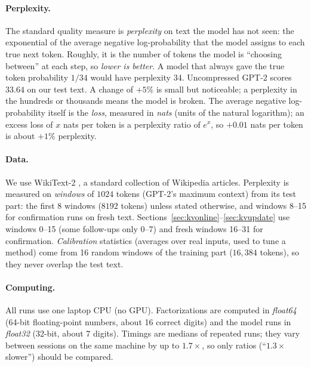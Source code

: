 \documentclass[10pt]{article}
\theoremstyle{plain}
\theoremstyle{definition}
\theoremstyle{remark}
\begin{document}
\paragraph{Perplexity.}
The standard quality measure is \emph{perplexity} on text the model has not seen: the exponential of the average negative log-probability that the model assigns to each true next token. Roughly, it is the number of tokens the model is ``choosing between'' at each step, so \emph{lower is better}. A model that always gave the true token probability $1/34$ would have perplexity 34. Uncompressed GPT-2 scores $33.64$ on our test text. A change of $+5\%$ is small but noticeable; a perplexity in the hundreds or thousands means the model is broken. The average negative log-probability itself is the \emph{loss}, measured in \emph{nats} (units of the natural logarithm); an excess loss of $x$ nats per token is a perplexity ratio of $e^x$, so $+0.01$ nats per token is about $+1\%$ perplexity.

\paragraph{Data.}
We use WikiText-2 \cite{merity2017}, a standard collection of Wikipedia articles. Perplexity is measured on \emph{windows} of $1024$ tokens (GPT-2's maximum context) from its test part: the first 8 windows ($8192$ tokens) unless stated otherwise, and windows 8--15 for confirmation runs on fresh text. Sections~\ref{sec:kvonline}--\ref{sec:kvupdate} use windows 0--15 (some follow-ups only 0--7) and fresh windows 16--31 for confirmation. \emph{Calibration} statistics (averages over real inputs, used to tune a method) come from 16 random windows of the training part ($16{,}384$ tokens), so they never overlap the test text.

\paragraph{Computing.}
All runs use one laptop CPU (no GPU). Factorizations are computed in \emph{float64} (64-bit floating-point numbers, about 16 correct digits) and the model runs in \emph{float32} (32-bit, about 7 digits). Timings are medians of repeated runs; they vary between sessions on the same machine by up to $1.7\times$, so only ratios (``$1.3\times$ slower'') should be compared.
\end{document}
